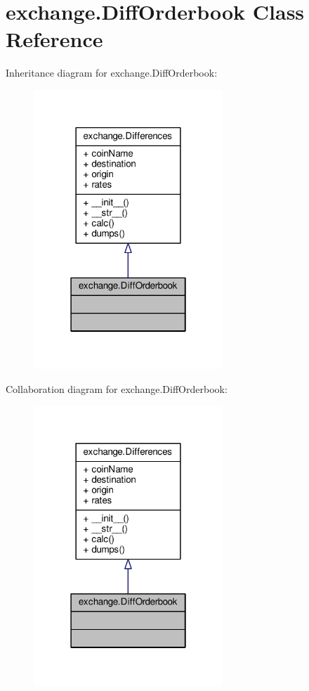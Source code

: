 \hypertarget{classexchange_1_1_diff_orderbook}{}\section{exchange.\+Diff\+Orderbook Class Reference}
\label{classexchange_1_1_diff_orderbook}


Inheritance diagram for exchange.\+Diff\+Orderbook\+:\nopagebreak
\begin{figure}[H]
\begin{center}
\leavevmode
\includegraphics[width=202pt]{classexchange_1_1_diff_orderbook__inherit__graph}
\end{center}
\end{figure}


Collaboration diagram for exchange.\+Diff\+Orderbook\+:\nopagebreak
\begin{figure}[H]
\begin{center}
\leavevmode
\includegraphics[width=202pt]{classexchange_1_1_diff_orderbook__coll__graph}
\end{center}
\end{figure}
